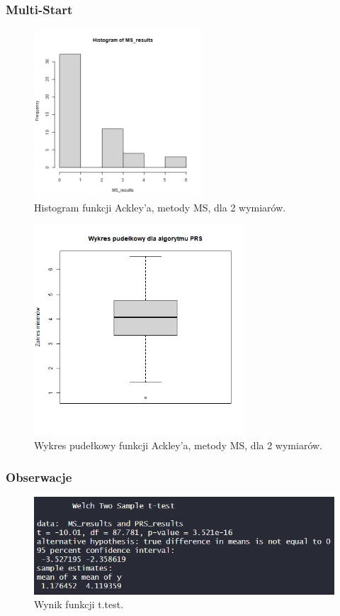 \documentclass{lab}
\begin{document}
\subsubsection{Multi-Start}
\begin{figure}[H]
  \centering
  \includegraphics[width=0.56\textwidth]{img/dim2_MS_Ackley_his.png}
  \caption{Histogram funkcji Ackley'a, metody MS, dla 2 wymiarów.}
\end{figure}
\begin{figure}[H]
  \centering
  \includegraphics[width=0.7\textwidth]{img/dim2_MS_Ackley.png}
  \caption{Wykres pudełkowy funkcji Ackley'a, metody MS, dla 2 wymiarów.}
\end{figure}

\subsubsection{Obserwacje}
 \begin{figure}[H]
     \centering
     \includegraphics[width=0.9\linewidth]{img/T2.png}
     \caption{Wynik funkcji t.test.}
     \label{fig:enter-label}
 \end{figure}
\end{document}
